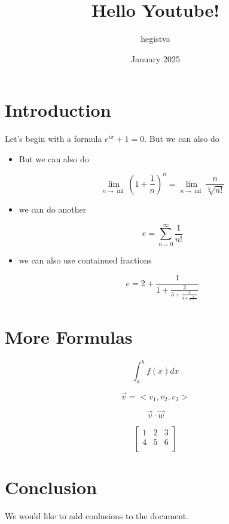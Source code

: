 \documentclass{article}
\title{Hello Youtube!}
\author{hegistva}
\date{January 2025}
\begin{document}
\maketitle

\section{Introduction}

Let's begin with a formula $e^{i\pi}+1=0$. But we can also do

\begin{itemize}

    \item But we can also do

          $$ \lim_{n\to\inf} \left(1 + \frac{1}{n}\right)^n = \lim_{n\to\inf}\frac{n}{\sqrt[n]{n!}} $$

    \item we can do another

          $$e=\sum_{n=0}^{\infty} \frac{1}{n!}$$

    \item we can also use containued fractions

          $$ e=2+\frac{1}{1+\frac{2}{3+\frac{3}{4+\frac{4}{5+\ddots}}}}$$

\end{itemize}

\section{More Formulas}

$$ \int_a^b f(x)dx $$


$$\vec{v} = <v_1, v_2, v_3> $$

$$\vec{v}\cdot \vec{w}$$

$$
    \begin{bmatrix}
        1 & 2 & 3 \\
        4 & 5 & 6 \\
    \end{bmatrix}
$$

\section{Conclusion}

We would like to add conlusions to the document.
\end{document}
